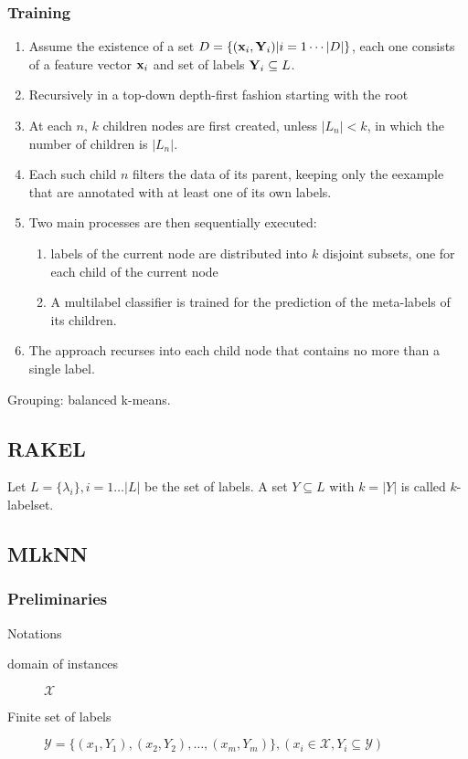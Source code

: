 \subsubsection{Training}
\begin{enumerate}
    \item Assume the existence of a set $D = \{(\mathbf{x}_i, \mathbf{Y}_i) | i = 1
        \cdots |D|\}$, each one consists of a feature vector $\mathbf{x}_i$ and
        set of labels $\mathbf{Y}_i \subseteq L$.
    \item Recursively in a top-down depth-first fashion starting with the
        root
    \item At each $n$, $k$ children nodes are first created, unless $|L_n|
        < k$, in which the number of children is $|L_n|$.
    \item Each such child $n$ filters the data of its parent, keeping only
        the eexample that are annotated with at least one of its own
        labels.
    \item Two main processes are then sequentially executed:
        \begin{enumerate}
            \item labels of the current node are distributed into $k$
                disjoint subsets, one for each child of the current node
            \item A multilabel classifier is trained for the prediction of
                the meta-labels of its children.
        \end{enumerate}
    \item The approach recurses into each child node that contains no more
        than a single label.
\end{enumerate}

Grouping: balanced k-means.

\subsection{RAKEL}
Let $L = \{\lambda_i\}, i = 1 \dots |L|$ be the set of labels. A set
$Y\subseteq L$ with $k = |Y|$ is called $k$-labelset.

\subsection{MLkNN}
\subsubsection{Preliminaries}
Notations
\begin{description}
    \item[domain of instances] $\mathcal{X}$
    \item[Finite set of labels] $\mathcal{Y} = \{(x_1, Y_1), (x_2, Y_2),
        \dots, (x_m, Y_m)\}, (x_i \in \mathcal{X}, Y_i \subseteq
        \mathcal{Y})$
\end{description}

